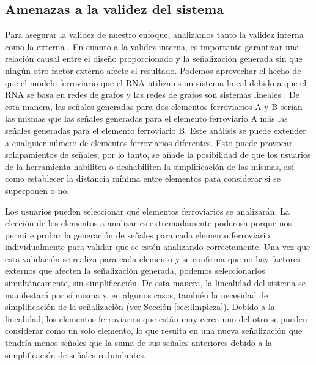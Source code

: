\subsection{Amenazas a la validez del sistema}
    \label{sec:validacion}
    Para asegurar la validez de nuestro enfoque, analizamos tanto la validez interna como la externa \cite{Paper_185}. En cuanto a la validez interna, es importante garantizar una relación causal entre el diseño proporcionado y la señalización generada sin que ningún otro factor externo afecte el resultado. Podemos aprovechar el hecho de que el modelo ferroviario que el RNA utiliza es un sistema lineal debido a que el RNA se basa en redes de grafos \cite{Paper_109,Paper_112,Paper_149,Paper_150,Paper_201} y las redes de grafos son sistemas lineales \cite{Paper_19,Paper_86,Paper_89,Paper_101,Paper_102,Paper_114,Paper_115,Paper_141,Paper_142,Paper_144,Paper_146,Paper_151,Paper_154,Paper_155,Paper_162,Paper_163,Paper_169,Paper_171,Paper_180}. De esta manera, las señales generadas para dos elementos ferroviarios A y B serían las mismas que las señales generadas para el elemento ferroviario A más las señales generadas para el elemento ferroviario B. Este análisis se puede extender a cualquier número de elementos ferroviarios diferentes. Esto puede provocar solapamientos de señales, por lo tanto, se añade la posibilidad de que los usuarios de la herramienta habiliten o deshabiliten la simplificación de las mismas, así como establecer la distancia mínima entre elementos para considerar si se superponen o no.

    Los usuarios pueden seleccionar qué elementos ferroviarios se analizarán. La elección de los elementos a analizar es extremadamente poderosa porque nos permite probar la generación de señales para cada elemento ferroviario individualmente para validar que se estén analizando correctamente. Una vez que esta validación se realiza para cada elemento y se confirma que no hay factores externos que afecten la señalización generada, podemos seleccionarlos simultáneamente, sin simplificación. De esta manera, la linealidad del sistema se manifestará por sí misma y, en algunos casos, también la necesidad de simplificación de la señalización (ver Sección \ref{sec:limpieza}). Debido a la linealidad, los elementos ferroviarios que están muy cerca uno del otro se pueden considerar como un solo elemento, lo que resulta en una nueva señalización que tendría menos señales que la suma de sus señales anteriores debido a la simplificación de señales redundantes.

